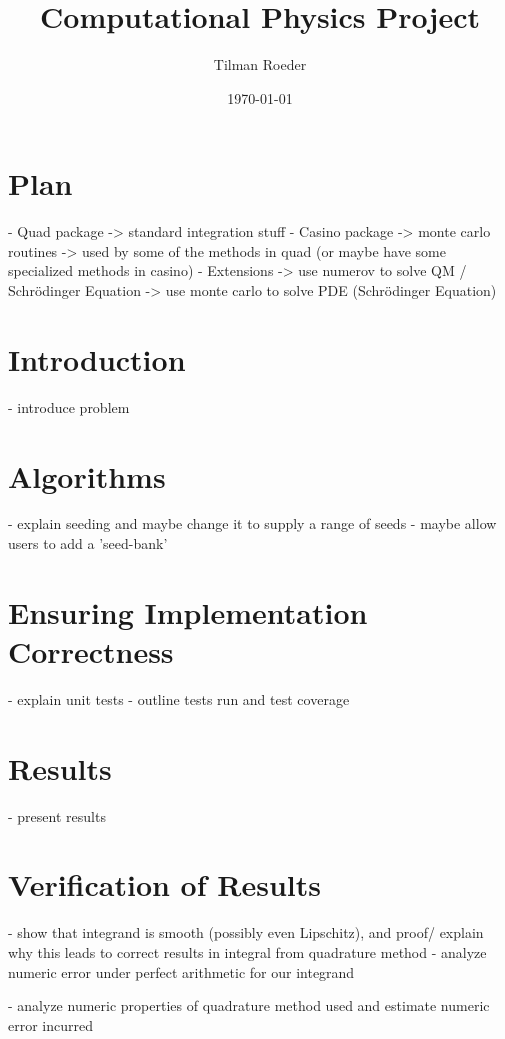 \documentclass[10pt, a4paper]{article}
\title{Computational Physics Project}
\author{Tilman Roeder}
\date{\today}
\begin{document}
\maketitle

\section{Plan}
- Quad package -> standard integration stuff
- Casino package -> monte carlo routines
  -> used by some of the methods in quad (or maybe have some specialized methods in casino)
- Extensions
  -> use numerov to solve QM / Schrödinger Equation
  -> use monte carlo to solve PDE (Schrödinger Equation)

\section{Introduction}

- introduce problem

\section{Algorithms}

- explain seeding and maybe change it to supply a range of seeds
  - maybe allow users to add a 'seed-bank'

\section{Ensuring Implementation Correctness}

- explain unit tests
- outline tests run and test coverage

\section{Results}

- present results

\section{Verification of Results}

- show that integrand is smooth (possibly even Lipschitz), and proof/ explain why this leads to
  correct results in integral from quadrature method
  - analyze numeric error under perfect arithmetic for our integrand

- analyze numeric properties of quadrature method used and estimate numeric error incurred
\end{document}
